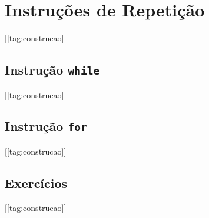 \section{Instruções de Repetição}\label{cap_progest_sec_repete}

[[tag:construcao]]

\subsection{Instrução \lstinline+while+}

[[tag:construcao]]

\subsection{Instrução \lstinline+for+}

[[tag:construcao]]

\subsection{Exercícios}

[[tag:construcao]]
